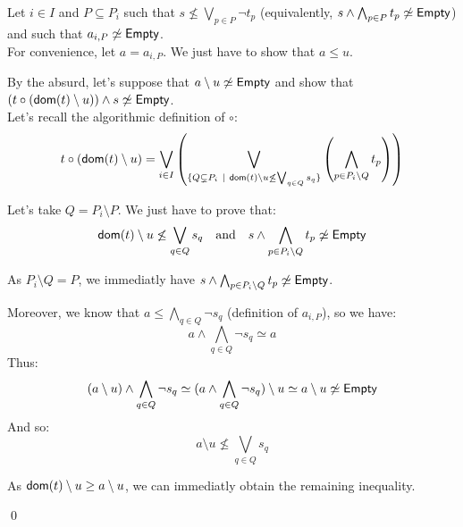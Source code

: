 \documentclass[a4paper]{article}%
\begin{document}
    Let $i \in I$ and $P \subseteq P_i$ such that $s \not\leq \bigvee_{p \in P} \neg t_p$ (equivalently, $s \land \bigwedge_{p \in P} t_p \not\simeq \textsf{Empty}$) and such that $a_{i,P} \not\simeq \textsf{Empty}$.\\
    For convenience, let $a = a_{i,P}$. We just have to show that $a \leq u$.

    By the absurd, let's suppose that $a \setminus u \not\simeq \textsf{Empty}$ and show that $(t\circ(\textsf{dom}(t) \setminus u)) \land s \not\simeq \textsf{Empty}$.\\

    Let's recall the algorithmic definition of $\circ$:
    \[t\circ(\textsf{dom}(t) \setminus u) = \bigvee_{i\in I}\left(\bigvee_{\{Q\subsetneq P_i~|~ \textsf{dom}(t) \setminus u \not\leq\bigvee_{q\in Q}s_q\}}\left(\bigwedge_{p\in P_i\setminus Q}t_p\right)\right)\]

    Let's take $Q = P_i \setminus P$. We just have to prove that:
    \[ \textsf{dom}(t) \setminus u \not\leq\bigvee_{q\in Q}s_q \text{\ \ \ and\ \ \ } s \land \bigwedge_{p\in P_i\setminus Q}t_p \not\simeq \textsf{Empty} \]

    As $P_i \setminus Q = P$, we immediatly have $s \land \bigwedge_{p\in P_i\setminus Q}t_p \not\simeq \textsf{Empty}$.

    Moreover, we know that $a \leq \bigwedge_{q \in Q} \neg s_q$ (definition of $a_{i,P}$), so we have:
    \[a \land \bigwedge_{q\in Q} \neg s_q \simeq a\]
    Thus: \[(a \setminus u) \land \bigwedge_{q\in Q} \neg s_q \simeq (a \land \bigwedge_{q\in Q} \neg s_q) \setminus u \simeq a \setminus u \not\simeq \textsf{Empty}\]
    And so: \[ a \setminus u \not\leq \bigvee_{q\in Q}s_q \]

    As $ \textsf{dom}(t) \setminus u \geq a \setminus u$, we can immediatly obtain the remaining inequality.

    \qed
    \pagebreak

    
\end{document}
